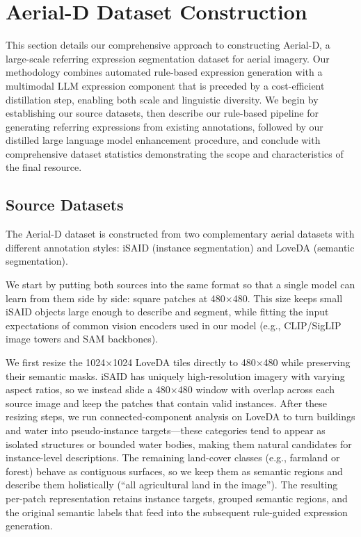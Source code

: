 
\section{Aerial-D Dataset Construction}
\label{sec:approach}

This section details our comprehensive approach to constructing Aerial-D, a large-scale referring expression segmentation dataset for aerial imagery. Our methodology combines automated rule-based expression generation with a multimodal LLM expression component that is preceded by a cost-efficient distillation step, enabling both scale and linguistic diversity. We begin by establishing our source datasets, then describe our rule-based pipeline for generating referring expressions from existing annotations, followed by our distilled large language model enhancement procedure, and conclude with comprehensive dataset statistics demonstrating the scope and characteristics of the final resource.

\subsection{Source Datasets}

The Aerial-D dataset is constructed from two complementary aerial datasets with different annotation styles: iSAID (instance segmentation) and LoveDA (semantic segmentation).

We start by putting both sources into the same format so that a single model can learn from them side by side: square patches at 480×480. This size keeps small iSAID objects large enough to describe and segment, while fitting the input expectations of common vision encoders used in our model (e.g., CLIP/SigLIP image towers and SAM backbones\cite{clip,siglip,sam}).

We first resize the 1024×1024 LoveDA tiles directly to 480×480 while preserving their semantic masks. iSAID has uniquely high-resolution imagery with varying aspect ratios, so we instead slide a 480×480 window with overlap across each source image and keep the patches that contain valid instances. After these resizing steps, we run connected-component analysis on LoveDA to turn buildings and water into pseudo-instance targets—these categories tend to appear as isolated structures or bounded water bodies, making them natural candidates for instance-level descriptions. The remaining land-cover classes (e.g., farmland or forest) behave as contiguous surfaces, so we keep them as semantic regions and describe them holistically (“all agricultural land in the image”). The resulting per-patch representation retains instance targets, grouped semantic regions, and the original semantic labels that feed into the subsequent rule-guided expression generation.


